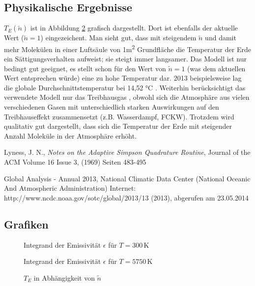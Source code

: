 \documentclass[10pt,a4paper]{article}
\begin{document}
\subsection{Physikalische Ergebnisse}
\label{ssec:physikalischeergebnisse}

$T_E(\tilde{n})$ ist in Abbildung \ref{fig:ergebnisse} grafisch dargestellt. Dort ist ebenfalls der aktuelle Wert ($\tilde{n}=1$) eingezeichent. Man sieht gut, dass mit steigendem $\tilde{n}$ und damit mehr  Molekülen in einer Luftsäule von 1\si{\meter^2} Grundfläche die Temperatur der Erde ein Sättigungsverhalten aufweist; sie steigt immer langsamer. Das Modell ist nur bedingt gut geeignet, es stellt schon für den Wert von $\tilde{n}=1$ (was dem aktuellen Wert entsprechen würde) eine zu hohe Temperatur dar. 2013 beispielsweise lag die globale Durchschnittstemperatur bei 14,52 \si{\celsius} \cite{noaa}. Weiterhin berücksichtigt das verwendete Modell nur das Treibhausgas , obwohl sich die Atmosphäre aus vielen verschiedenen Gasen mit unterschiedlich starken Auswirkungen auf den Treibhauseffekt zusammensetzt (z.B. Wasserdampf, FCKW). Trotzdem wird qualitativ gut dargestellt, dass sich die Temperatur der Erde mit steigender Anzahl  Moleküle in der Atmosphäre erhöht.

\begin{thebibliography}{9}

 Lyness, J. N.,
 \emph{Notes on the Adaptive Simpson Quadrature Routine},
Journal of the ACM
Volume 16 Issue 3, (1969) 
Seiten 483-495 

Global Analysis - Annual 2013, National Climatic Data Center (National Oceanic And Atmospheric Administration) Internet: http://www.ncdc.noaa.gov/sotc/global/2013/13 (2013), abgerufen am 23.05.2014

\end{thebibliography}

\begin{appendix}
\section{Grafiken}

\begin{figure}[htbp]
\centering

\caption{Integrand der Emissivität $\epsilon$ für $T=300\, \si{\kelvin}$}


\caption{Integrand der Emissivität $\epsilon$ für $T=5750\, \si{\kelvin}$}
\label{fig:integranden}
\end{figure}

\begin{figure}
\centering

\caption{$T_E$ in Abhängigkeit von $\tilde{n}$}
\label{fig:ergebnisse}
\end{figure}
\end{appendix}
\end{document}
